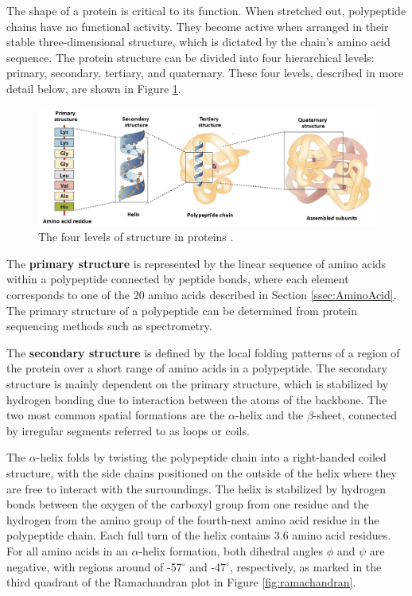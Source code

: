 The shape of a protein is critical to its function. When stretched out, polypeptide chains have no functional activity. They become active when arranged in their stable three-dimensional structure, which is dictated by the chain's amino acid sequence. The protein structure can be divided into four hierarchical levels: primary, secondary, tertiary, and quaternary. These four levels, described in more detail below, are shown in Figure \ref{fig:protein}.

\begin{figure}[h!]
	\begin{center}
		\includegraphics[width=1\textwidth]{fig/BspStruct.jpg}
	\end{center}
	\caption[The four levels of structure in proteins.]{The four levels of structure in proteins \cite{Nelson.2013}.}
	\label{fig:protein}
\end{figure}



The \textbf{primary structure} is represented by the linear sequence of amino acids within a polypeptide connected by peptide bonds, where each element corresponds  to one of the 20 amino acids described in  Section \ref{ssec:AminoAcid}. The primary structure of a polypeptide can  be determined from protein sequencing methods such as spectrometry. 

The \textbf{secondary structure} is defined by the local folding patterns of a region of the protein over a short range of amino acids in a polypeptide. The secondary structure is mainly dependent on the primary structure, which is stabilized by hydrogen bonding due to interaction between the atoms of the backbone.
The two most common spatial formations are the $\alpha$-helix and the $\beta$-sheet, connected by irregular segments referred to as loops or coils. 

The $\alpha$-helix folds by twisting the polypeptide chain into a right-handed coiled structure, with the side chains positioned on the outside of the helix where they are free to interact with the surroundings. The helix is stabilized by hydrogen bonds between the oxygen of the carboxyl group from one residue and the hydrogen from the amino group of the fourth-next amino acid residue in the polypeptide chain.
 Each full turn of the helix contains 3.6 amino acid residues. For all amino acids in an $\alpha$-helix formation, both dihedral angles $\phi$  and $\psi$ are negative, with regions around of -57$^{\circ}$ and -47$^{\circ}$, respectively, as marked in the third quadrant of the Ramachandran plot in Figure \ref{fig:ramachandran}.

